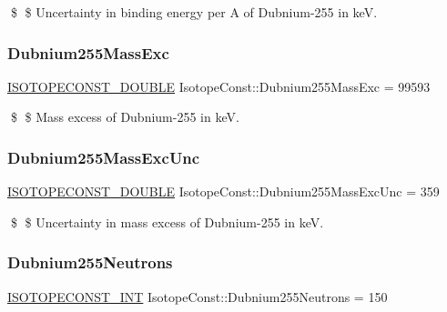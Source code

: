 \$ \$ Uncertainty in binding energy per A of Dubnium-\/255 in keV. \mbox{\label{group___isotope_const-_dubnium-_db255_gaf1907e05a16c01104f6e488614a03292}} 
\subsubsection{\texorpdfstring{Dubnium255\+Mass\+Exc}{Dubnium255MassExc}}
{\footnotesize\ttfamily \mbox{\hyperlink{group___isotope_const-_macros_ga8f45a7272ce02c0b4c65c44636ed719a}{I\+S\+O\+T\+O\+P\+E\+C\+O\+N\+S\+T\+\_\+\+D\+O\+U\+B\+LE}} Isotope\+Const\+::\+Dubnium255\+Mass\+Exc = 99593}

\$ \$ Mass excess of Dubnium-\/255 in keV. \mbox{\label{group___isotope_const-_dubnium-_db255_gae42f20728b198722eabbf8a32757fcc9}} 
\subsubsection{\texorpdfstring{Dubnium255\+Mass\+Exc\+Unc}{Dubnium255MassExcUnc}}
{\footnotesize\ttfamily \mbox{\hyperlink{group___isotope_const-_macros_ga8f45a7272ce02c0b4c65c44636ed719a}{I\+S\+O\+T\+O\+P\+E\+C\+O\+N\+S\+T\+\_\+\+D\+O\+U\+B\+LE}} Isotope\+Const\+::\+Dubnium255\+Mass\+Exc\+Unc = 359}

\$ \$ Uncertainty in mass excess of Dubnium-\/255 in keV. \mbox{\label{group___isotope_const-_dubnium-_db255_gaed7e9bbb1d0110d5764a45b06928574f}} 
\subsubsection{\texorpdfstring{Dubnium255\+Neutrons}{Dubnium255Neutrons}}
{\footnotesize\ttfamily \mbox{\hyperlink{group___isotope_const-_macros_ga5f18360b3e99483a35c32d789e62621c}{I\+S\+O\+T\+O\+P\+E\+C\+O\+N\+S\+T\+\_\+\+I\+NT}} Isotope\+Const\+::\+Dubnium255\+Neutrons = 150}

